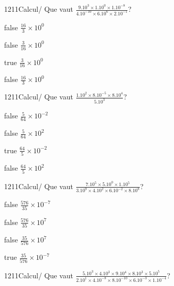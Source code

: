             \begin{question}{1211}{Calcul}{}{/}
                Que vaut $\frac{9.10^{3}\times 1.10^{0}\times 1.10^{-8}}{4.10^{-10}\times 6.10^{6}\times 2.10^{-1}}$?
            \end{question}
            \begin{reponses}
                \item[false] $\frac{16}{3}\times 10^{0}$
                \item[false] $\frac{3}{16}\times 10^{0}$
                \item[true] $\frac{3}{16}\times 10^{0}$
                \item[false] $\frac{16}{3}\times 10^{0}$
            \end{reponses}
            \begin{question}{1211}{Calcul}{}{/}
                Que vaut $\frac{1.10^{2}\times 8.10^{-5}\times 8.10^{4}}{5.10^{3}}$?
            \end{question}
            \begin{reponses}
                \item[false] $\frac{5}{64}\times 10^{-2}$
                \item[false] $\frac{5}{64}\times 10^{2}$
                \item[true] $\frac{64}{5}\times 10^{-2}$
                \item[false] $\frac{64}{5}\times 10^{2}$
            \end{reponses}
            \begin{question}{1211}{Calcul}{}{/}
                Que vaut $\frac{7.10^{5}\times 5.10^{0}\times 1.10^{5}}{3.10^{9}\times 4.10^{2}\times 6.10^{-2}\times 8.10^{8}}$?
            \end{question}
            \begin{reponses}
                \item[false] $\frac{576}{35}\times 10^{-7}$
                \item[false] $\frac{576}{35}\times 10^{7}$
                \item[false] $\frac{35}{576}\times 10^{7}$
                \item[true] $\frac{35}{576}\times 10^{-7}$
            \end{reponses}
            \begin{question}{1211}{Calcul}{}{/}
                Que vaut $\frac{5.10^{3}\times 4.10^{3}\times 9.10^{4}\times 8.10^{3}\times 5.10^{5}}{2.10^{1}\times 4.10^{-8}\times 8.10^{-10}\times 6.10^{-3}\times 1.10^{-4}}$?
            \end{question}
